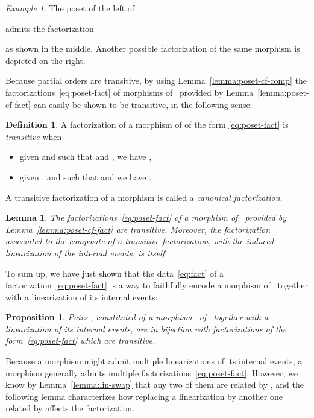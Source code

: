 \documentclass[submission,copyright,creativecommons]{eptcs}
\newtheorem{proposition}[theorem]{Proposition}
\newtheorem{lemma}[theorem]{Lemma}
\theoremstyle{definition}
\newtheorem{definition}[theorem]{Definition}
\theoremstyle{remark}
\newtheorem{example}[theorem]{Example}
\begin{document}
\begin{example}
  \label{ex:poset-cf}
  The poset  of the left of
  
  admits the factorization
  
  as shown in the middle. Another possible factorization of the same morphism is
  depicted on the right.
\end{example}

\noindent
Because partial orders are transitive, by using Lemma~\ref{lemma:poset-cf-comp}
the factorizations~\eqref{eq:poset-fact} of morphisms of~ provided by
Lemma~\ref{lemma:poset-cf-fact} can easily be shown to be transitive, in the
following sense:

\begin{definition}
  \label{def:cf-trans}
  A factorization of a morphism of  of the form \eqref{eq:poset-fact} is
  \emph{transitive} when
  \begin{itemize}
  \item given  and  such that  and
    , we have ,
  \item given ,  and  such that  and
     we have .
  \end{itemize}
A transitive factorization of a morphism is called a \emph{canonical
    factorization}.
\end{definition}

\begin{lemma}
  The factorizations~\eqref{eq:poset-fact} of a morphism of~ provided by
  Lemma~\ref{lemma:poset-cf-fact} are transitive. Moreover, the factorization
  associated to the composite of a transitive factorization, with the induced
  linearization of the internal events, is itself.
\end{lemma}

\noindent
To sum up, we have just shown that the data~\eqref{eq:fact} of a
factorization~\eqref{eq:poset-fact} is a way to faithfully encode a morphism
of~ together with a linearization of its internal events:

\begin{proposition}
  \label{prop:poset-lin-cf}
  Pairs , constituted of a morphism~ of~ together with a
  linearization  of its internal events, are in bijection with factorizations
  of the form~\eqref{eq:poset-fact} which are transitive.
\end{proposition}

Because a morphism might admit multiple linearizations of its internal events, a
morphism generally admits multiple
factorizations~\eqref{eq:poset-fact}. However, we know by
Lemma~\ref{lemma:lin-swap} that any two of them are related by , and the
following lemma characterizes how replacing a linearization by another one
related by  affects the factorization.
\end{document}
